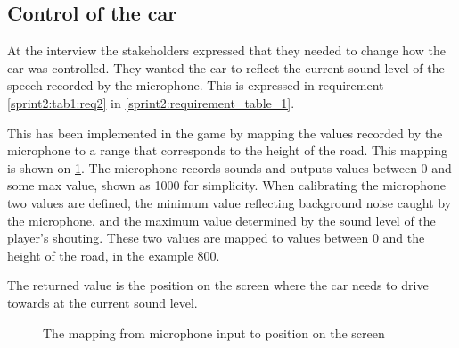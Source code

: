 \subsection{Control of the car}\label{sprint2:car_control}
At the interview the stakeholders expressed that they needed to change how the car was controlled.
They wanted the car to reflect the current sound level of the speech recorded by the microphone.
This is expressed in requirement \ref{sprint2:tab1:req2} in \cref{sprint2:requirement_table_1}.

This has been implemented in the game by mapping the values recorded by the microphone to a range that corresponds to the height of the road.
This mapping is shown on \cref{mapping}.
The microphone records sounds and outputs values between 0 and some max value, shown as 1000 for simplicity.
When calibrating the microphone two values are defined, the minimum value reflecting background noise caught by the microphone, and the maximum value determined by the sound level of the player's shouting.
These two values are mapped to values between 0 and the height of the road, in the example 800.

The returned value is the position on the screen where the car needs to drive towards at the current sound level.

\begin{figure}
\centering

\caption{The mapping from microphone input to position on the screen}
\label{mapping}
\end{figure}
